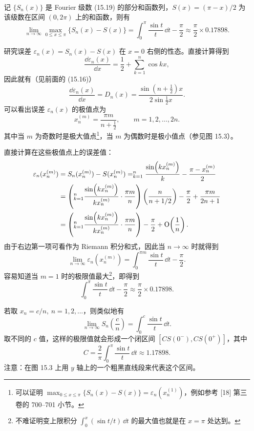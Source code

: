 \begin{xexample}[15.2.1（Gibbs 现象）]
记 $\{S_n(x)\}$ 是 Fourier 级数 (15.19) 的部分和函数列，$S(x)=(\pi-x)/2$ 为该级数在区间 $(0,2\pi)$ 上的和函数，则有
\[
  \lim_{n\to\infty}\max_{0\le x\le\pi}\{S_n(x)-S(x)\}
  =\int_0^{\pi}\frac{\sin t}{t}\,\dd t-\frac\pi2
  \approx\frac\pi2\times0.17898.
\]
\end{xexample}
\begin{xproof}
研究误差 $\varepsilon_n(x)=S_n(x)-S(x)$ 在 $x=0$ 右侧的性态。直接计算得到
\[
  \frac{\dd\varepsilon_n(x)}{\dd x}=\frac12+\sum_{k=1}^{n}\cos kx,
\]
因此就有（见前面的 (15.16)）
\[
  \frac{\dd\varepsilon_n(x)}{\dd x}=D_n(x)=\frac{\sin(n+\frac12)x}{2\sin\frac12x}.
\]
可以看出误差 $\varepsilon_n(x)$ 的极值点为
\[
  x_n^{(m)}=\frac{\pi m}{n+\frac12},\qquad m=1,2,\ldots,2n.
\]
其中当 $m$ 为奇数时是极大值点\footnote{可以证明 $\max_{0\le x\le\pi}\{S_n(x)-S(x)\}=\varepsilon_n(x_n^{(1)})$，例如参考 [18] 第三卷的 700--701 小节。}，当 $m$ 为偶数时是极小值点（参见图 15.3）。

直接计算在这些极值点上的误差值：
\begin{align*}
  \varepsilon_n(x_n^{(m)})
  &=S_n(x_n^{(m)})-S(x_n^{(m)})
   =\relax_{k=1}^{n}\frac{\sin(kx_n^{(m)})}{k}-\frac{\pi-x_n^{(m)}}2\\
  &=\left(\relax_{k=1}^{n}\frac{\sin(kx_n^{(m)})}{kx_n^{(m)}}\cdot\frac{\pi m}{n}\right)
    \left(\frac{n}{n+1/2}\right)-\frac\pi2+\frac{\pi m}{2n+1}\\
  &=\left(\relax_{k=1}^{n}\frac{\sin(kx_n^{(m)})}{kx_n^{(m)}}\cdot\frac{\pi m}{n}\right)-\frac\pi2+\mathrm{O}\!\left(\frac1n\right).
\end{align*}
由于右边第一项可看作为 Riemann 积分和式，因此当 $n\to\infty$ 时就得到
\[
  \lim_{n\to\infty}\varepsilon_n(x_n^{(m)})=\int_0^{\pi m}\frac{\sin t}{t}\,\dd t-\frac\pi2.
\]
容易知道当 $m=1$ 时的极限值最大\footnote{不难证明变上限积分 $\int_0^x(\sin t/t)\,\dd t$ 的最大值也就是在 $x=\pi$ 处达到。}，即得到
\[
  \int_0^{\pi}\frac{\sin t}{t}\,\dd t-\frac\pi2\approx\frac\pi2\times0.17898.
\]
\end{xproof}

\begin{xremark}
若取 $x_n=c/n,\ n=1,2,\ldots$，则类似地有
\[
  \lim_{n\to\infty}S_n\left(\frac cn\right)=\int_0^c\frac{\sin t}{t}\,\dd t.
\]
取不同的 $c$ 值，这样的极限值就会形成一个闭区间 $[CS(0^-),CS(0^+)]$，其中
\[
  C=\frac2\pi\int_0^{\pi}\frac{\sin t}{t}\,\dd t\approx1.17898.
\]
注意：在图 15.3 上用 $y$ 轴上的一个粗黑直线段来代表这个区间。
\end{xremark}

